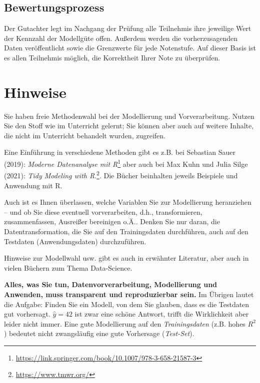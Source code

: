 \documentclass[
]{book}
\begin{document}
\hypertarget{bewertungsprozess}{%
\subsection{Bewertungsprozess}\label{bewertungsprozess}}

Der Gutachter legt im Nachgang der Prüfung alle Teilnehmis ihre jeweilige Wert der Kennzahl der Modellgüte offen.
Außerdem werden die vorherzusagenden Daten veröffentlicht
sowie die Grenzwerte für jede Notenstufe.
Auf dieser Basis ist es allen Teilnehmis möglich,
die Korrektheit Ihrer Note zu überprüfen.

\hypertarget{hinweise-6}{%
\section{Hinweise}\label{hinweise-6}}

Sie haben freie Methodenwahl bei der Modellierung und Vorverarbeitung. Nutzen Sie den Stoff wie im Unterricht gelernt; Sie können aber auch auf weitere Inhalte, die nicht im Unterricht behandelt wurden, zugreifen.

Eine Einführung in verschiedene Methoden gibt es z.B. bei Sebastian Sauer (2019): \emph{Moderne Datenanalyse mit R}\footnote{\url{https://link.springer.com/book/10.1007/978-3-658-21587-3}} aber auch bei Max Kuhn und Julia Silge (2021): \emph{Tidy Modeling with R}.\footnote{\url{https://www.tmwr.org/}}. Die Bücher beinhalten jeweils Beispiele und Anwendung mit R.

Auch ist es Ihnen überlassen, welche Variablen Sie zur Modellierung heranziehen -- und ob Sie diese eventuell vorverarbeiten, d.h., transformieren, zusammenfassen, Ausreißer bereinigen o.Ä.. Denken Sie nur daran, die Datentransformation, die Sie auf den Trainingsdaten durchführen, auch auf den Testdaten (Anwendungsdaten) durchzuführen.

Hinweise zur Modellwahl usw. gibt es auch in erwähnter Literatur, aber auch in vielen Büchern zum Thema Data-Science.

\textbf{Alles, was Sie tun, Datenvorverarbeitung, Modellierung und Anwenden, muss transparent und reproduzierbar sein.} Im Übrigen lautet die Aufgabe:
Finden Sie ein Modell, von dem Sie glauben, dass es die Testdaten gut vorhersagt. \(\hat{y}=42\) ist zwar eine schöne Antwort,
trifft die Wirklichkeit aber leider nicht immer.
Eine gute Modellierung auf den \emph{Trainingsdaten} (z.B. hohes \(R^2\)) bedeutet nicht zwangsläufig eine gute Vorhersage (\emph{Test-Set}).
\end{document}

